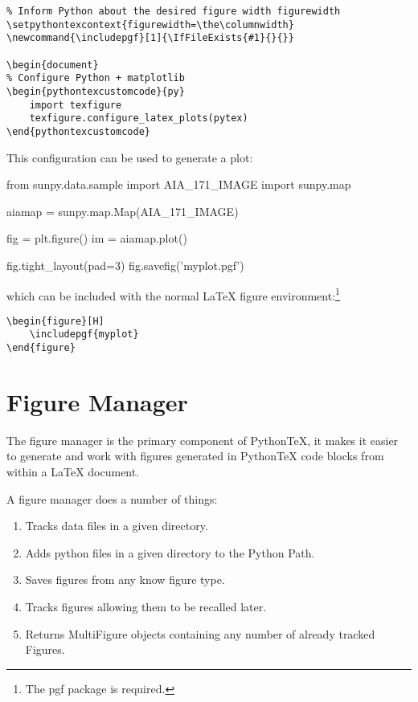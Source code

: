 \documentclass[]{article}
\makeatletter
\renewenvironment{pythontexcustomcode}[2][begin]{%
	\VerbatimEnvironment
	\Depythontex{env:pythontexcustomcode:om:n}%
	\ifstrequal{#1}{begin}{}{%
		\ifstrequal{#1}{end}{}{\PackageError{\pytx@packagename}%
			{Invalid optional argument for pythontexcustomcode}{}
		}%
	}%
	\xdef\pytx@type{CC:#2:#1}%
	\edef\pytx@cmd{code}%
	\pytx@SetContext
	\def\pytx@group{none}%
	\pytx@BeginCodeEnv[none]}%
{\end{VerbatimOut}%
\setcounter{FancyVerbLine}{\value{pytx@FancyVerbLineTemp}}%
\stepcounter{\pytx@counter}%
}%
\newcommand{\includepgf}[1]{\IfFileExists{#1}{}{}}
\makeatother
\begin{document}
\begin{verbatim}
% Inform Python about the desired figure width figurewidth
\setpythontexcontext{figurewidth=\the\columnwidth}
\newcommand{\includepgf}[1]{\IfFileExists{#1}{}{}}

\begin{document}
% Configure Python + matplotlib
\begin{pythontexcustomcode}{py}
	import texfigure
	texfigure.configure_latex_plots(pytex)
\end{pythontexcustomcode}
\end{verbatim}

This configuration can be used to generate a plot:

\begin{pyblock}
from sunpy.data.sample import AIA_171_IMAGE
import sunpy.map

aiamap = sunpy.map.Map(AIA_171_IMAGE)

fig = plt.figure()
im = aiamap.plot()

fig.tight_layout(pad=3)
fig.savefig('myplot.pgf')
\end{pyblock}

which can be included with the normal LaTeX figure environment:\footnote{The pgf package is required.}

\begin{verbatim}
\begin{figure}[H]
	\includepgf{myplot}
\end{figure}
\end{verbatim}

\begin{figure}[H]
	\includepgf{myplot.pgf}
\end{figure}

\section{Figure Manager}

The figure manager is the primary component of PythonTeX, it makes it easier to
generate and work with figures generated in PythonTeX code blocks from within a
LaTeX document.

A figure manager does a number of things:

\begin{enumerate}
\item Tracks data files in a given directory.
\item Adds python files in a given directory to the Python Path.
\item Saves figures from any know figure type.
\item Tracks figures allowing them to be recalled later.
\item Returns MultiFigure objects containing any number of already tracked
  Figures.
\end{enumerate}
\end{document}
